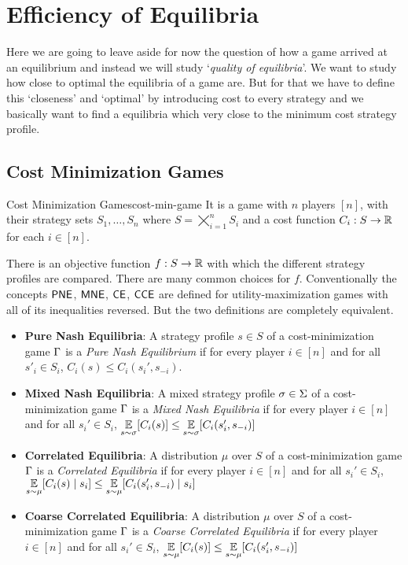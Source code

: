 \chapter{Efficiency of Equilibria}
Here we are going to leave aside for now the question of how a game arrived at an equilibrium and instead we will study `\textit{quality of equilibria}'. We want to study how close to optimal the equilibria of a game are. But for that we have to define this `closeness' and `optimal'  by introducing cost to every strategy and we basically want to find a equilibria which very close to the minimum cost strategy profile.
\section{Cost Minimization Games}
\begin{definition}{Cost Minimization Games}{cost-min-game}
	It is a game with $n$ players $[n]$, with their strategy sets $S_1,\dots, S_n$  where $S=\bigtimes\limits_{i=1}^n S_i$ and a cost function $C_i:S\to \mathbb{R}$ for each $i\in[n]$. 
\end{definition}
 
There is an objective function $f:S\to \mathbb{R}$ with which the different strategy profiles are compared. There are many common choices for $f$. Conventionally the concepts $\operatorname{\mathsf{PNE}}$, $\operatorname{\mathsf{MNE}}$, $\operatorname{\mathsf{CE}}$, $\operatorname{\mathsf{CCE}}$ are defined for utility-maximization games with all of its inequalities reversed. But the two definitions are completely equivalent.\begin{itemize}
	\item \textbf{Pure Nash Equilibria}: A strategy profile $s\in S$ of a cost-minimization game $\Gamma$ is a \textit{Pure Nash Equilibrium} if for every player $i\in[n]$ and for all $s'_i\in S_i$, $C_i(s)\leq C_i(s_i',s_{-i})$.
	\item \textbf{Mixed Nash Equilibria}: A mixed strategy profile $\sigma\in \Sigma$ of a cost-minimization game $\Gamma$ is a \textit{Mixed Nash Equilibria} if for every player $i\in[n]$ and for all $s_i'\in S_i$, $\underset{s\sim \sigma}{\mathbb{E}}[C_i(s)]\leq \underset{s\sim \sigma}{\mathbb{E}}[C_i(s_i',s_{-i})]$
	\item \textbf{Correlated Equilibria}: A distribution $\mu$ over $S$ of a cost-minimization game $\Gamma$ is a \textit{Correlated Equilibria} if for every player $i\in[n]$ and for all $s_i'\in S_i$, $\underset{s\sim \mu}{\mathbb{E}}[C_i(s)\mid s_i]\leq \underset{s\sim \mu}{\mathbb{E}}[C_i(s_i',s_{-i})\mid s_i]$
	\item \textbf{Coarse Correlated Equilibria}: A distribution $\mu$ over $S$ of a cost-minimization game $\Gamma$ is a \textit{Coarse Correlated Equilibria} if for every player $i\in[n]$ and for all $s_i'\in S_i$, $\underset{s\sim \mu}{\mathbb{E}}[C_i(s)]\leq \underset{s\sim \mu}{\mathbb{E}}[C_i(s_i',s_{-i})]$
\end{itemize}

